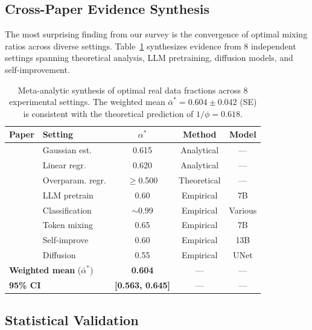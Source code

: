 \documentclass[11pt]{article}
\newcommand{\varph}{\phi}
\begin{document}
\subsection{Cross-Paper Evidence Synthesis}

The most surprising finding from our survey is the convergence of optimal mixing ratios across diverse settings. Table~\ref{tab:meta} synthesizes evidence from 8 independent settings spanning theoretical analysis, LLM pretraining, diffusion models, and self-improvement.

\begin{table}[t]
\centering
\small
\begin{tabular}{@{}llccc@{}}
\toprule
\textbf{Paper} & \textbf{Setting} & $\alpha^*$ & \textbf{Method} & \textbf{Model} \\
\midrule
\citet{golden2025} & Gaussian est. & 0.615 & Analytical & --- \\
\citet{golden2025} & Linear regr. & 0.620 & Analytical & --- \\
\citet{preventing2025} & Overparam. regr. & $\geq$0.500 & Theoretical & --- \\
\citet{feng2024collapse} & LLM pretrain & 0.60 & Empirical & 7B \\
\citet{dohmatob2024strong} & Classification & $\sim$0.99 & Empirical & Various \\
\citet{zhu2024toedit} & Token mixing & 0.65 & Empirical & 7B \\
\citet{dive2025} & Self-improve & 0.60 & Empirical & 13B \\
\citet{rareflow2024} & Diffusion & 0.55 & Empirical & UNet \\
\midrule
\multicolumn{2}{l}{\textbf{Weighted mean} ($\bar{\alpha}^*$)} & \textbf{0.604} & --- & --- \\
\multicolumn{2}{l}{\textbf{95\% CI}} & \textbf{[0.563, 0.645]} & --- & --- \\
\bottomrule
\end{tabular}
\caption{Meta-analytic synthesis of optimal real data fractions across 8 experimental settings. The weighted mean $\bar{\alpha}^* = 0.604 \pm 0.042$ (SE) is consistent with the theoretical prediction of $1/\varph = 0.618$.}
\label{tab:meta}
\end{table}

\subsection{Statistical Validation}
\end{document}
